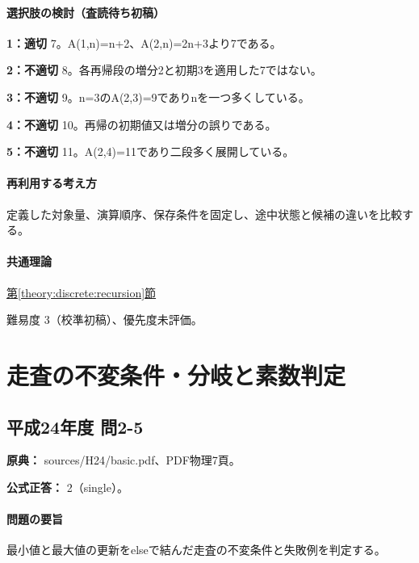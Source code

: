 \paragraph{選択肢の検討（査読待ち初稿）}\mbox{}\par

\noindent\textbf{1：適切} 7。A(1,n)=\allowbreak{}n+2、A(2,n)=\allowbreak{}2n+3より7である。\par

\noindent\textbf{2：不適切} 8。各再帰段の増分2と初期3を適用した7ではない。\par

\noindent\textbf{3：不適切} 9。n=\allowbreak{}3のA(2,3)=\allowbreak{}9でありnを一つ多くしている。\par

\noindent\textbf{4：不適切} 10。再帰の初期値又は増分の誤りである。\par

\noindent\textbf{5：不適切} 11。A(2,4)=\allowbreak{}11であり二段多く展開している。\par

\paragraph{再利用する考え方} 定義した対象量、演算順序、保存条件を固定し、途中状態と候補の違いを比較する。

\paragraph{共通理論} \hyperref[theory:discrete:recursion]{第\ref*{theory:discrete:recursion}節}

\par 難易度 3（校準初稿）、優先度未評価。

\section{走査の不変条件・分岐と素数判定}

\subsection{平成24年度 問2-5}
\label{q:h24-reg-basic-2-5}

\noindent\textbf{原典：} sources/H24/basic.pdf、PDF物理7頁。

\textbf{公式正答：} 2（single）。

\paragraph{問題の要旨} 最小値と最大値の更新をelseで結んだ走査の不変条件と失敗例を判定する。

